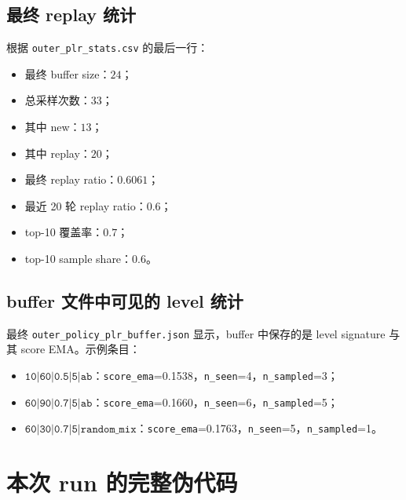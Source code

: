 \documentclass[11pt,a4paper]{ctexart}
\begin{document}
\subsection{最终 replay 统计}
根据 \texttt{outer\_plr\_stats.csv} 的最后一行：
\begin{itemize}[leftmargin=2.2em,itemsep=0.2em]
    \item 最终 buffer size：\(24\)；
    \item 总采样次数：\(33\)；
    \item 其中 new：\(13\)；
    \item 其中 replay：\(20\)；
    \item 最终 replay ratio：\(0.6061\)；
    \item 最近 20 轮 replay ratio：\(0.6\)；
    \item top-10 覆盖率：\(0.7\)；
    \item top-10 sample share：\(0.6\)。
\end{itemize}

\subsection{buffer 文件中可见的 level 统计}
最终 \texttt{outer\_policy\_plr\_buffer.json} 显示，buffer 中保存的是 level signature 与其 score EMA。示例条目：
\begin{itemize}[leftmargin=2.2em,itemsep=0.2em]
    \item \(\texttt{10|60|0.5|5|ab}\)：\texttt{score\_ema}=0.1538，\texttt{n\_seen}=4，\texttt{n\_sampled}=3；
    \item \(\texttt{60|90|0.7|5|ab}\)：\texttt{score\_ema}=0.1660，\texttt{n\_seen}=6，\texttt{n\_sampled}=5；
    \item \(\texttt{60|30|0.7|5|random\_mix}\)：\texttt{score\_ema}=0.1763，\texttt{n\_seen}=5，\texttt{n\_sampled}=1。
\end{itemize}

\section{本次 run 的完整伪代码}
\end{document}
